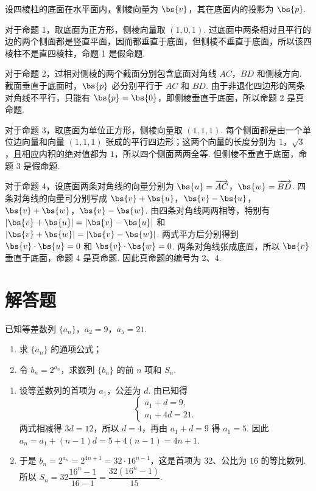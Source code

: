 \begin{solution}
设四棱柱的底面在水平面内，侧棱向量为 \(\bs{v}\)，其在底面内的投影为 \(\bs{p}\).

对于命题 1，取底面为正方形，侧棱向量取 \((1,0,1)\). 过底面中两条相对且平行的边的两个侧面都是竖直平面，因而都垂直于底面，但侧棱不垂直于底面，所以该四棱柱不是直四棱柱，命题 1 是假命题.

对于命题 2，过相对侧棱的两个截面分别包含底面对角线 \(AC\)，\(BD\) 和侧棱方向. 截面垂直于底面时，\(\bs{p}\) 必分别平行于 \(AC\) 和 \(BD\). 由于非退化四边形的两条对角线不平行，只能有 \(\bs{p}=\bs{0}\)，即侧棱垂直于底面，所以命题 2 是真命题.

对于命题 3，取底面为单位正方形，侧棱向量取 \((1,1,1)\). 每个侧面都是由一个单位边向量和向量 \((1,1,1)\) 张成的平行四边形；这两个向量的长度分别为 \(1\)，\(\sqrt3\)，且相应内积的绝对值都为 \(1\)，所以四个侧面两两全等. 但侧棱不垂直于底面，命题 3 是假命题.

对于命题 4，设底面两条对角线的向量分别为 \(\bs{u}=\overrightarrow{AC}\)，\(\bs{w}=\overrightarrow{BD}\). 四条对角线的向量可分别写成 \(\bs{v}+\bs{u}\)，\(\bs{v}-\bs{u}\)，\(\bs{v}+\bs{w}\)，\(\bs{v}-\bs{w}\). 由四条对角线两两相等，特别有 \(\left|\bs{v}+\bs{u}\right|=\left|\bs{v}-\bs{u}\right|\) 和 \(\left|\bs{v}+\bs{w}\right|=\left|\bs{v}-\bs{w}\right|\). 两式平方后分别得到 \(\bs{v}\cdot\bs{u}=0\) 和 \(\bs{v}\cdot\bs{w}=0\). 两条对角线张成底面，所以 \(\bs{v}\) 垂直于底面，命题 4 是真命题. 因此真命题的编号为 2、4.
\end{solution}

\section{解答题}
\begin{problem}
已知等差数列 \(\{a_n\}\)，\(a_2=9\)，\(a_5=21\).

\begin{enumerate}
\item 求 \(\{a_n\}\) 的通项公式；
\item 令 \(b_n=2^{a_n}\)，求数列 \(\{b_n\}\) 的前 \(n\) 项和 \(S_n\).
\end{enumerate}
\end{problem}

\begin{solution}
\begin{enumerate}
\item
设等差数列的首项为 \(a_1\)，公差为 \(d\). 由已知得
\[
\begin{cases}
a_1+d=9,\\
a_1+4d=21.
\end{cases}
\]
两式相减得 \(3d=12\)，所以 \(d=4\)，再由 \(a_1+d=9\) 得 \(a_1=5\). 因此 \(a_n=a_1+(n-1)d=5+4(n-1)=4n+1\).

\item
于是 \(b_n=2^{a_n}=2^{4n+1}=32\cdot16^{n-1}\)，这是首项为 \(32\)、公比为 \(16\) 的等比数列. 所以 \(S_n=32\dfrac{16^n-1}{16-1}=\dfrac{32(16^n-1)}{15}\).
\end{enumerate}
\end{solution}


